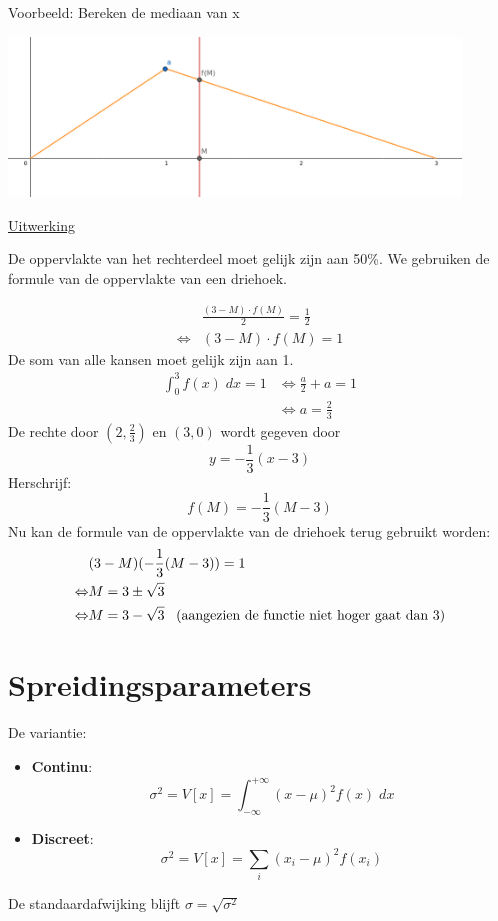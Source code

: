 \documentclass[12pt]{report}
\newcommand{\example}[2]{
      \hrulefill
      
      Voorbeeld: #1
      
      \underline{Uitwerking}
      
      #2
      
      \hrulefill
  }
\begin{document}
\example{Bereken de mediaan van x
\begin{center}
 \includegraphics[width=0.90\textwidth]{oef_mediaan}
\end{center}
}{
De oppervlakte van het rechterdeel moet gelijk zijn aan 50\%. We gebruiken de formule van de oppervlakte van een driehoek.

\begin{equation*}
 \begin{split}
  &  \frac{(3 - M) \cdot f(M)}{2} = \frac{1}{2} \\
  \Leftrightarrow & (3 - M) \cdot f(M) = 1
 \end{split}
\end{equation*}
De som van alle kansen moet gelijk zijn aan 1.
\begin{equation*}
 \begin{split}
  \int_{0}^{3}f(x)\;dx = 1 & \Leftrightarrow \frac{a}{2} + a = 1\\
  & \Leftrightarrow a = \frac{2}{3}
 \end{split}
\end{equation*}
De rechte door $(2, \frac{2}{3})$ en $(3, 0)$ wordt gegeven door 
$$y = -\frac{1}{3}(x-3)$$
Herschrijf:
$$f(M) = -\frac{1}{3}(M - 3)$$
Nu kan de formule van de oppervlakte van de driehoek terug gebruikt worden:
\begin{equation*}
 \begin{split}
  & (3 - M)(-\frac{1}{3}(M - 3)) = 1  \\
  \Leftrightarrow & M = 3 \pm \sqrt{3}\\
  \Leftrightarrow & M = 3 - \sqrt{3} \;\;\;\hbox{(aangezien de functie niet hoger gaat dan 3)}
  \end{split}
\end{equation*}
}

\section{Spreidingsparameters}
De variantie:
\begin{itemize}
 \item \textbf{Continu}: $$\sigma^2 = V[x] = \int_{-\infty}^{+\infty}(x-\mu)^2 f(x)\; dx$$
 \item \textbf{Discreet}: $$\sigma^2 = V[x] = \sum_{i}(x_i - \mu)^2 f(x_i)$$
\end{itemize}
De standaardafwijking blijft $\sigma = \sqrt{\sigma^2}$
\end{document}
